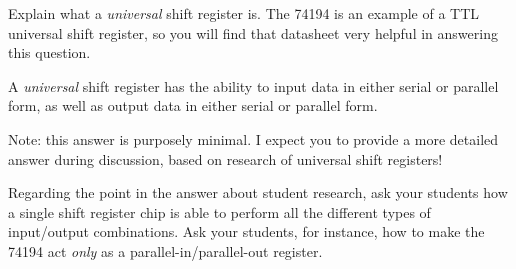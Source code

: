 

Explain what a {\it universal} shift register is.  The 74194 is an example of a TTL universal shift register, so you will find that datasheet very helpful in answering this question.







A {\it universal} shift register has the ability to input data in either serial or parallel form, as well as output data in either serial or parallel form.

Note: this answer is purposely minimal.  I expect you to provide a more detailed answer during discussion, based on research of universal shift registers!







Regarding the point in the answer about student research, ask your students how a single shift register chip is able to perform all the different types of input/output combinations.  Ask your students, for instance, how to make the 74194 act {\it only} as a parallel-in/parallel-out register.




